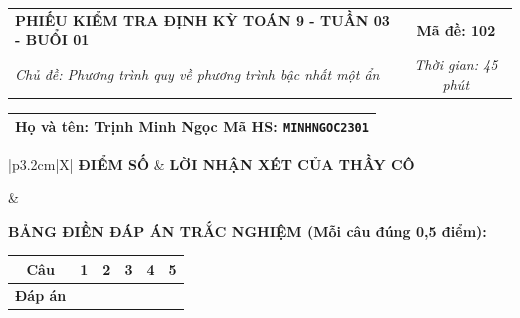 \documentclass[12pt,a4paper]{article}
\begin{document}
\newpage


\noindent
\begin{tabularx}{\linewidth}{|X|c|}
\hline
\textbf{PHIẾU KIỂM TRA ĐỊNH KỲ TOÁN 9 - TUẦN 03 - BUỔI 01} & \textbf{Mã đề: 102} \\
\textit{Chủ đề: Phương trình quy về phương trình bậc nhất một ẩn} & \textit{Thời gian: 45 phút} \\
\hline
\end{tabularx}

\vspace{1mm}

\noindent
\begin{tabularx}{\linewidth}{|X|}
\hline
\rule[-2mm]{0pt}{7.5mm}\textbf{Họ và tên:} \textbf{\large Trịnh Minh Ngọc} \hfill \textbf{Mã HS:} \texttt{MINHNGOC2301} \quad \\
\hline
\end{tabularx}

\vspace{1mm}

\noindent
\begin{tabularx}{\linewidth}{|p{3.2cm}|X|}
\hline
\centering\textbf{ĐIỂM SỐ} & \centering\textbf{LỜI NHẬN XÉT CỦA THẦY CÔ} \tabularnewline
\hline
\rule{0pt}{1.3cm} & \tabularnewline
\hline
\end{tabularx}

\vspace{1.2mm}

\noindent\textbf{BẢNG ĐIỀN ĐÁP ÁN TRẮC NGHIỆM (Mỗi câu đúng 0,5 điểm):}
\vspace{0.8mm}

\noindent
\renewcommand{\arraystretch}{1.35}
\begin{tabularx}{\linewidth}{|c|*{5}{>{\centering\arraybackslash}X|}}
\hline
\textbf{Câu} & \textbf{1} & \textbf{2} & \textbf{3} & \textbf{4} & \textbf{5} \\
\hline
\textbf{Đáp án} & & & & & \\
\hline
\end{tabularx}
\renewcommand{\arraystretch}{1.0}

\vspace{1.5mm}
\end{document}
